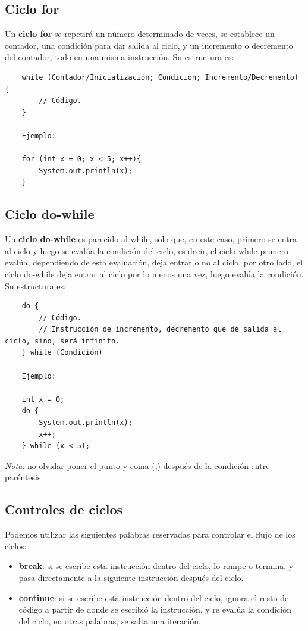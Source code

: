 \subsection{Ciclo for}
\hspace{0.55cm}Un \textbf{ciclo for} se repetirá un número determinado de veces, se establece un contador, una condición para dar salida al ciclo, y un incremento o decremento del contador, todo en una misma instrucción. Su estructura es:
\begin{lstlisting}
    while (Contador/Inicialización; Condición; Incremento/Decremento) {
        // Código.
    }
    
    Ejemplo:
    
    for (int x = 0; x < 5; x++){
        System.out.println(x);
    }
\end{lstlisting}


\subsection{Ciclo do-while}
\hspace{0.55cm}Un \textbf{ciclo do-while} es parecido al while, solo que, en este caso, primero se entra al ciclo y luego se evalúa la condición del ciclo, es decir, el ciclo while primero evalúa, dependiendo de esta evaluación, deja entrar o no al ciclo, por otro lado, el ciclo do-while deja entrar al ciclo por lo menos una vez, luego evalúa la condición. Su estructura es:
\begin{lstlisting}
    do {
        // Código.
        // Instrucción de incremento, decremento que dé salida al ciclo, sino, será infinito.
    } while (Condición)
    
    Ejemplo:
    
    int x = 0;
    do {
        System.out.println(x);
        x++;
    } while (x < 5);
\end{lstlisting}

\textit{Nota}: no olvidar poner el punto y coma (;) después de la condición entre paréntesis.


\subsection{Controles de ciclos}
\hspace{0.55cm}Podemos utilizar las siguientes palabras reservadas para controlar el flujo de los ciclos:
\begin{itemize}
    \item \textbf{break}: si se escribe esta instrucción dentro del ciclo, lo rompe o termina, y pasa directamente a la siguiente instrucción después del ciclo.
    \item \textbf{continue}: si se escribe esta instrucción dentro del ciclo, ignora el resto de código a partir de donde se escribió la instrucción, y re evalúa la condición del ciclo, en otras palabras, se salta una iteración.
\end{itemize}

